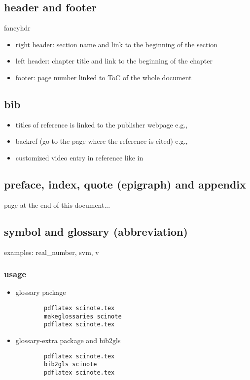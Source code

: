 \subsection{header and footer}
fancyhdr
\begin{itemize}
	\item right header: section name and link to the beginning of the section
	\item left header: chapter title and link to the beginning of the chapter
	\item footer: page number linked to ToC of the whole document
\end{itemize}

\subsection{bib}
\begin{itemize}
	\item titles of reference is linked to the publisher webpage e.g., \cite{kitaev2002classical}
	\item backref (go to the page where the reference is cited) e.g., \cite{childsUniversalComputationQuantum2009}
	\item customized video entry in reference like in \cite{babaiGraphIsomorphismQuasipolynomial2016}
\end{itemize}

\subsection{preface, index, quote (epigraph) and appendix}
 page at the end of this document...

\subsection{symbol and glossary (abbreviation)}
examples:
\gls{real_number},
\gls{svm},
\gls{v}

\subsubsection{usage}
\begin{itemize}
	\item glossary package
	      \begin{verbatim}
		pdflatex scinote.tex
		makeglossaries scinote
		pdflatex scinote.tex
	\end{verbatim}

	\item glossary-extra package and bib2gls
	      \begin{verbatim}
		pdflatex scinote.tex
		bib2gls scinote
		pdflatex scinote.tex
	\end{verbatim}
\end{itemize}

